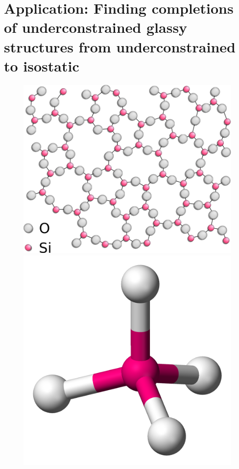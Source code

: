 \section{Application: Finding completions of underconstrained glassy structures from underconstrained to isostatic}
\label{sec:bodypin}

% 



\ClearMyMinHeight
{}

\begin{figure}\centering
    \includegraphics[height=\myMinHeight]{img/Silica}
    \hspace{0.5cm}
    \includegraphics[height=\myMinHeight]{img/Silicon_tetrahedron}

\end{figure}
